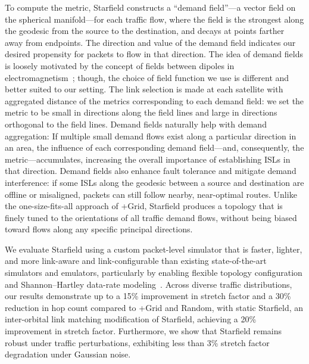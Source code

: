 \documentclass[acmsmall, screen]{acmart}
\begin{document}
To compute the metric, Starfield constructs a ``demand field''---a vector field on the spherical manifold---for each traffic flow, where the field is the strongest along the geodesic from the source to the destination, and decays at points farther away from endpoints. The direction and value of the demand field indicates our desired propensity for packets to flow in that direction. The idea of demand fields is loosely motivated by the concept of fields between dipoles in electromagnetism~\cite{griffiths2023introduction}; though, the choice of field function we use is different and better suited to our setting. The link selection is made at each satellite with aggregated distance of the metrics corresponding to each demand field: we set the metric to be small in directions along the field lines and large in directions orthogonal to the field lines. Demand fields naturally help with demand aggregation: If multiple small demand flows exist along a particular direction in an area, the influence of each corresponding demand field—and, consequently, the metric—accumulates, increasing the overall importance of establishing ISLs in that direction. Demand fields also enhance fault tolerance and mitigate demand interference: if some ISLs along the geodesic between a source and destination are offline or misaligned, packets can still follow nearby, near-optimal routes. Unlike the one-size-fits-all approach of +Grid, Starfield produces a topology that is finely tuned to the orientations of all traffic demand flows, without being biased toward flows along any specific principal directions.

We evaluate Starfield using a custom packet-level simulator that is faster, lighter, and more link-aware and link-configurable than existing state-of-the-art simulators and emulators, particularly by enabling flexible topology configuration and Shannon–Hartley data-rate modeling~\cite{shannon1948mathematical}. Across diverse traffic distributions, our results demonstrate up to a 15\% improvement in stretch factor and a 30\% reduction in hop count compared to +Grid and Random, with static Starfield, an inter-orbital link matching modification of Starfield, achieving a 20\% improvement in stretch factor. Furthermore, we show that Starfield remains robust under traffic perturbations, exhibiting less than 3\% stretch factor degradation under Gaussian noise.
\end{document}
